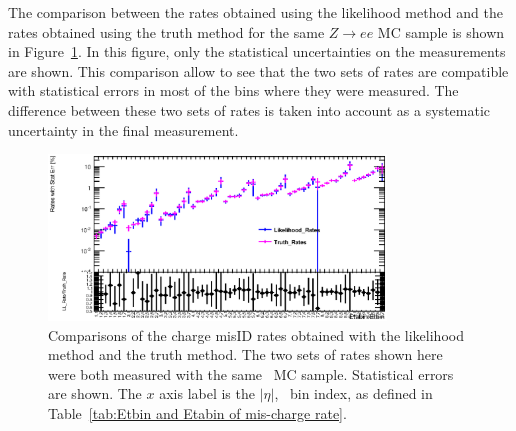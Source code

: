    
The comparison between the rates obtained using the likelihood method and the rates obtained using the truth method for the same $Z\rightarrow ee$ MC sample is shown in Figure~\ref{fig:LL_Truth_Comparison}. In this figure, only the statistical uncertainties on the measurements are shown.
This comparison allow to see that the two sets of rates are compatible with statistical errors in most of the bins where they were measured. The difference between these two sets of rates is taken into account as a systematic uncertainty in the final measurement.


\begin{figure}[htp]
\centering
\includegraphics[width=0.8\textwidth]{figures/ChargeMisID/LL_TR_Com_new.eps}

\caption{Comparisons of the charge misID rates obtained with the likelihood method and the truth method. The two sets of rates shown here were both measured with the same \Zee\ MC sample.
Statistical errors are shown. The $x$ axis label is
  the $|\eta|$, \pt\ bin index, as defined in Table~\ref{tab:Etbin and Etabin of mis-charge rate}.}
  
\label{fig:LL_Truth_Comparison}
\end{figure}  

